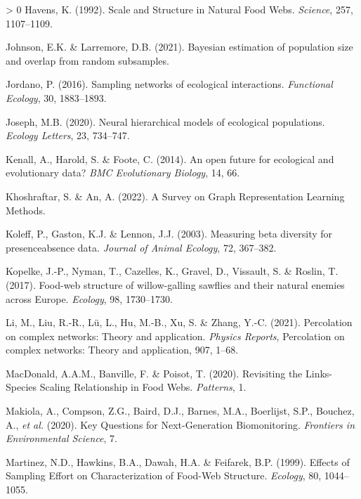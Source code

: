 \documentclass[11pt]{article}
\newlength{\cslhangindent}
\newenvironment{CSLReferences}[3] %
 {%
  \setlength{\parindent}{0pt}
  \ifodd #1 \everypar{\setlength{\hangindent}{\cslhangindent}}\ignorespaces\fi
  \ifnum #2 > 0
  \setlength{\parskip}{#2\baselineskip}
  \fi
 }%
 {}
\begin{document}
\begin{CSLReferences}{1}{0}
\leavevmode\hypertarget{ref-Havens1992ScaStr}{}%
Havens, K. (1992). Scale and Structure in Natural Food Webs.
\emph{Science}, 257, 1107--1109.

\leavevmode\hypertarget{ref-Johnson2021BayEst}{}%
Johnson, E.K. \& Larremore, D.B. (2021). Bayesian estimation of
population size and overlap from random subsamples.

\leavevmode\hypertarget{ref-Jordano2016SamNet}{}%
Jordano, P. (2016). Sampling networks of ecological interactions.
\emph{Functional Ecology}, 30, 1883--1893.

\leavevmode\hypertarget{ref-Joseph2020NeuHie}{}%
Joseph, M.B. (2020). Neural hierarchical models of ecological
populations. \emph{Ecology Letters}, 23, 734--747.

\leavevmode\hypertarget{ref-Kenall2014OpeFut}{}%
Kenall, A., Harold, S. \& Foote, C. (2014). An open future for
ecological and evolutionary data? \emph{BMC Evolutionary Biology}, 14,
66.

\leavevmode\hypertarget{ref-Khoshraftar2022SurGra}{}%
Khoshraftar, S. \& An, A. (2022). A Survey on Graph Representation
Learning Methods.

\leavevmode\hypertarget{ref-Koleff2003MeaBet}{}%
Koleff, P., Gaston, K.J. \& Lennon, J.J. (2003). Measuring beta
diversity for presenceabsence data. \emph{Journal of Animal Ecology},
72, 367--382.

\leavevmode\hypertarget{ref-Kopelke2017FooStr}{}%
Kopelke, J.-P., Nyman, T., Cazelles, K., Gravel, D., Vissault, S. \&
Roslin, T. (2017). Food-web structure of willow-galling sawflies and
their natural enemies across Europe. \emph{Ecology}, 98, 1730--1730.

\leavevmode\hypertarget{ref-Li2021PerCom}{}%
Li, M., Liu, R.-R., Lü, L., Hu, M.-B., Xu, S. \& Zhang, Y.-C. (2021).
Percolation on complex networks: Theory and application. \emph{Physics
Reports}, Percolation on complex networks: Theory and application, 907,
1--68.

\leavevmode\hypertarget{ref-MacDonald2020RevLin}{}%
MacDonald, A.A.M., Banville, F. \& Poisot, T. (2020). Revisiting the
Links-Species Scaling Relationship in Food Webs. \emph{Patterns}, 1.

\leavevmode\hypertarget{ref-Makiola2020KeyQue}{}%
Makiola, A., Compson, Z.G., Baird, D.J., Barnes, M.A., Boerlijst, S.P.,
Bouchez, A., \emph{et al.} (2020). Key Questions for Next-Generation
Biomonitoring. \emph{Frontiers in Environmental Science}, 7.

\leavevmode\hypertarget{ref-Martinez1999EffSam}{}%
Martinez, N.D., Hawkins, B.A., Dawah, H.A. \& Feifarek, B.P. (1999).
Effects of Sampling Effort on Characterization of Food-Web Structure.
\emph{Ecology}, 80, 1044--1055.


\end{CSLReferences}
\end{document}
